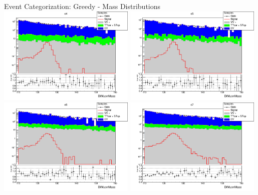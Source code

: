 \documentclass[pdf, 9pt]{beamer}
\begin{document}
  \begin{frame}{Event Categorization: Greedy - Mass Distributions}
    \includegraphics[width=0.49\textwidth, height=0.45\textheight]{figs/higgs/distributions/bdt_uf/distribution__c4__DiMuonMass__logY.png}
    \includegraphics[width=0.49\textwidth, height=0.45\textheight]{figs/higgs/distributions/bdt_uf/distribution__c5__DiMuonMass__logY.png}\\
    \includegraphics[width=0.49\textwidth, height=0.45\textheight]{figs/higgs/distributions/bdt_uf/distribution__c6__DiMuonMass__logY.png}
    \includegraphics[width=0.49\textwidth, height=0.45\textheight]{figs/higgs/distributions/bdt_uf/distribution__c7__DiMuonMass__logY.png}
  \end{frame}
\end{document}
